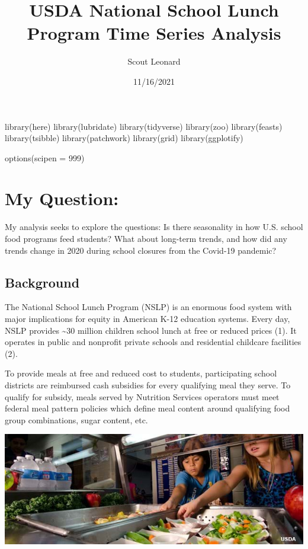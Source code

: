 \documentclass[
]{article}
\title{USDA National School Lunch Program Time Series Analysis}
\author{Scout Leonard}
\date{11/16/2021}
\newenvironment{Shaded}{\begin{snugshade}}{\end{snugshade}}
\newcommand{\AttributeTok}[1]{\textcolor[rgb]{0.77,0.63,0.00}{#1}}
\newcommand{\DecValTok}[1]{\textcolor[rgb]{0.00,0.00,0.81}{#1}}
\newcommand{\FunctionTok}[1]{\textcolor[rgb]{0.00,0.00,0.00}{#1}}
\newcommand{\NormalTok}[1]{#1}
\begin{document}
\maketitle

\begin{Shaded}
\begin{Highlighting}[]
\FunctionTok{library}\NormalTok{(here)}
\FunctionTok{library}\NormalTok{(lubridate)}
\FunctionTok{library}\NormalTok{(tidyverse)}
\FunctionTok{library}\NormalTok{(zoo)}
\FunctionTok{library}\NormalTok{(feasts)}
\FunctionTok{library}\NormalTok{(tsibble)}
\FunctionTok{library}\NormalTok{(patchwork)}
\FunctionTok{library}\NormalTok{(grid)}
\FunctionTok{library}\NormalTok{(ggplotify)}

\FunctionTok{options}\NormalTok{(}\AttributeTok{scipen =} \DecValTok{999}\NormalTok{)}
\end{Highlighting}
\end{Shaded}

\hypertarget{my-question}{%
\section{My Question:}\label{my-question}}

My analysis seeks to explore the questions: Is there seasonality in how
U.S. school food programs feed students? What about long-term trends,
and how did any trends change in 2020 during school closures from the
Covid-19 pandemic?

\hypertarget{background}{%
\subsection{Background}\label{background}}

The National School Lunch Program (NSLP) is an enormous food system with
major implications for equity in American K-12 education systems. Every
day, NSLP provides \textasciitilde30 million children school lunch at
free or reduced prices (1). It operates in public and nonprofit private
schools and residential childcare facilities (2).

To provide meals at free and reduced cost to students, participating
school districts are reimbursed cash subsidies for every qualifying meal
they serve. To qualify for subsidy, meals served by Nutrition Services
operators must meet federal meal pattern policies which define meal
content around qualifying food group combinations, sugar content, etc.

\includegraphics{lunch_image.jpg}
\end{document}
